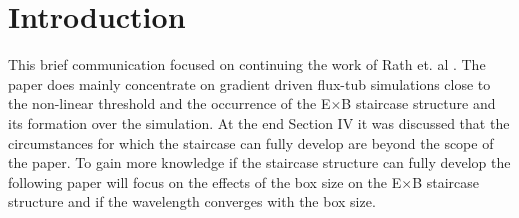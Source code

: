 \documentclass[aip, amsmath, amssymb, reprint, twocolumn]{revtex4-1}
\begin{document}









\section{Introduction}
\label{sec:intro}

This brief communication focused on continuing the work of Rath et. al \cite{doi:10.1063/1.4961231}. 
The paper does mainly concentrate on gradient driven flux-tub simulations close to the non-linear threshold and the occurrence of the E$\times$B staircase structure and its formation over the simulation.
At the end Section IV it was discussed that the circumstances for which the staircase can fully develop are beyond the scope of the paper.
To gain more knowledge if the staircase structure can fully develop the following paper will focus on the effects of the box size on the E$\times$B staircase structure and if the wavelength converges with the box size. 
\end{document}
